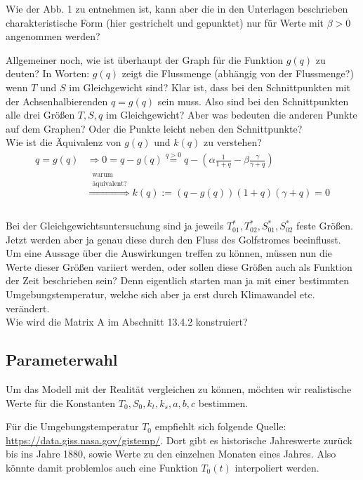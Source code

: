 \documentclass[10pt,a4paper]{article}
\begin{document}
	Wie der Abb. 1 zu entnehmen ist, kann aber die in den Unterlagen beschrieben charakteristische Form (hier gestrichelt und gepunktet) nur für Werte mit \(\beta > 0\) angenommen werden?
	
	Allgemeiner noch, wie ist überhaupt der Graph für die Funktion \(g(q)\) zu deuten? In Worten: \(g(q)\) zeigt die Flussmenge (abhängig von der Flussmenge?) wenn \(T\) und \(S\) im Gleichgewicht sind? Klar ist, dass bei den Schnittpunkten mit der Achsenhalbierenden \(q = g(q)\) sein muss. Also sind bei den Schnittpunkten alle drei Größen \(T,S,q\) im Gleichgewicht? Aber was bedeuten die anderen Punkte auf dem Graphen? Oder die Punkte leicht neben den Schnittpunkte? \\
	
	Wie ist die Äquivalenz von \(g(q)\) und \(k(q)\) zu verstehen?
	\begin{align*}
		q = g(q) &\Rightarrow 0 = q - g(q) \stackrel{q > 0}{=}  q - \left(\alpha \frac{1}{1+q} - \beta \frac{\gamma}{\gamma + q} \right) \\
		& \stackrel{\substack{\textrm{warum}\\\textrm{äquivalent?}}}{\Rightarrow}
		k(q) := \left( q - g(q) \right) (1+q) (\gamma + q) = 0 \\
	\end{align*} \\
	
	Bei der Gleichgewichtsuntersuchung sind ja jeweils \(T^*_{01}, T^*_{02}, S^*_{01}, S^*_{02}\) feste Größen. Jetzt werden aber ja genau diese durch den Fluss des Golfstromes beeinflusst. Um eine Aussage über die Auswirkungen treffen zu können, müssen nun die Werte dieser Größen variiert werden, oder sollen diese Größen auch als Funktion der Zeit beschrieben sein? Denn eigentlich starten man ja mit einer bestimmten Umgebungstemperatur, welche sich aber ja erst durch Klimawandel etc. verändert. \\
	
	Wie wird die Matrix A im Abschnitt 13.4.2 konstruiert?
	
	\newpage
	\subsection*{Parameterwahl}
	
	Um das Modell mit der Realität vergleichen zu können, möchten wir realistische Werte für die Konstanten \( T_0, S_0, k_t, k_s,  a, b, c\) bestimmen.
	
	Für die Umgebungstemperatur \(T_0\) empfiehlt sich folgende Quelle: \url{https://data.giss.nasa.gov/gistemp/}. Dort gibt es historische Jahreswerte zurück bis ins Jahre 1880, sowie Werte zu den einzelnen Monaten eines Jahres. Also könnte damit problemlos auch eine Funktion \(T_0(t)\) interpoliert werden.
	
\end{document}
